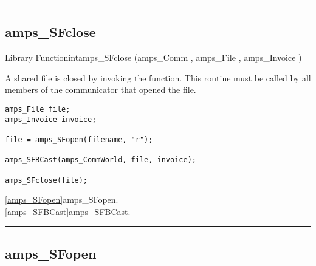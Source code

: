 
\noindent\rule{\textwidth}{1mm}

\subsection{amps\_SFclose}
\label{amps_SFclose}


\begin{deftypefn}{Library Function}{int}{amps\_SFclose}
(amps_Comm , amps_File , amps_Invoice )

\DESCRIPTION


A shared file is closed by invoking the  function.
This routine must be called by all members of the communicator that opened
the file.

\EXAMPLE
\begin{display}\begin{verbatim}
amps_File file;
amps_Invoice invoice;

file = amps_SFopen(filename, "r");

amps_SFBCast(amps_CommWorld, file, invoice);

amps_SFclose(file);
\end{verbatim}\end{display}

\SEEALSO
\vref{amps_SFopen}{amps\_SFopen}. \\
\vref{amps_SFBCast}{amps\_SFBCast}. \\

\end{deftypefn}


\noindent\rule{\textwidth}{1mm}

\subsection{amps\_SFopen}
\label{amps_SFopen}

